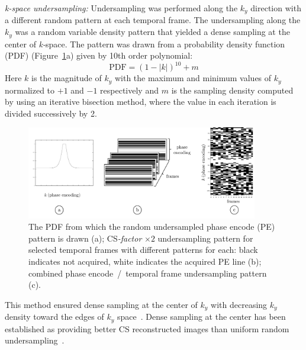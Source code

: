 \textit{k-space undersampling:}
Undersampling was performed along the $k_y$ direction with a different random pattern at each temporal frame. 
The undersampling along the $k_y$ was a random variable density pattern that yielded a dense sampling at the center of \mbox{\textit{k-}space}. 
The pattern was drawn from a probability density function (PDF) (Figure~\ref{fig: CS2}a) given by 10th order polynomial:
\begin{equation}\label{eq: CS1}
\mathrm{PDF} = (1-|k|)^{10} + m
\end{equation}
Here $k$ is the magnitude of $k_y$ with the maximum and minimum values of $k_y$ normalized to $+1$ and $-1$ respectively and $m$ is the sampling density computed by using an iterative bisection method, where the value in each iteration is divided successively by 2. 
\begin{figure}[!htb]
\vspace{+0.2cm}
\centering
\includegraphics[width=0.9\textwidth]{Figures/CS1_1.pdf}
\caption[The probability density function, two times undersampled pattern for selected temporal frames and combined phase encode~/~temporal frame undersampling pattern]{The PDF from which the random undersampled phase encode (PE) pattern is drawn (a); CS\textit{-factor} $\times 2$ undersampling pattern for selected temporal frames with different patterns for each: black indicates not acquired, white indicates the acquired PE line (b); combined phase encode~/~temporal frame undersampling pattern (c).}
\label{fig: CS2}
\end{figure}
This method ensured dense sampling at the center of $k_y$ with decreasing $k_y$ density toward the edges of $k_y$ space~\cite{RNCS10}. 
Dense sampling at the center has been established as providing better CS reconstructed images than uniform random undersampling~\cite{Lustig:2007cua, RNCS9}.

